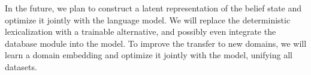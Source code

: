 \documentclass[letterpaper]{article} %
\newenvironment{customBoxed}
 {\trivlist\nopagebreak
  \parindent0pt
  \item\relax\obeylines}
 {\par
  \nopagebreak
  \vspace{0.2em}%
  \endtrivlist}
\newcommand{\customComment}[2]{
	\begin{customBoxed}
		\color{#2}
		\fbox{\parbox{\linewidth}{#1}}
	\end{customBoxed}}
\newcommand{\JK}[1]{\customComment{#1}{olive}\PackageWarning{paper}{JK: #1}}
\newcommand{\VH}[1]{{\textcolor{green!100!yellow!70!black!100!}{VH: #1}}}
\begin{document}

In the future, we plan to construct a latent representation of the belief state and optimize it jointly with the language model. We will replace the deterministic lexicalization with a trainable alternative, and possibly even integrate the database module into the model. To improve the transfer to new domains, we will learn a domain embedding and optimize it jointly with the model, unifying all datasets.




\end{document}
